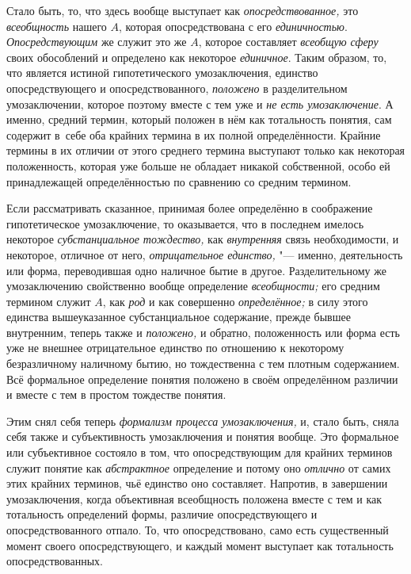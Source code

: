 Стало быть, то, что здесь вообще выступает как {\em опосредствованное,}
это {\em всеобщность} нашего $A$, которая опосредствована с его
{\em единичностью}. {\em Опосредствующим} же служит это же $A$,
которое составляет {\em всеобщую сферу}
своих обособлений и определено как некоторое {\em единичное}. Таким
образом, то, что является истиной гипотетического умозаключения, единство
опосредствующего и опосредствованного, {\em положено} в
разделительном умозаключении, которое поэтому вместе с тем уже и
{\em не есть умозаключение}.
А именно, средний термин, который положен в нём как
тотальность понятия, сам содержит в~себе оба крайних термина в их полной
определённости. Крайние термины в их отличии от этого среднего термина
выступают только как некоторая положенность, которая уже больше не обладает
никакой собственной, особо ей принадлежащей определённостью по сравнению со
средним термином.

Если рассматривать сказанное, принимая более определённо в
соображение гипотетическое умозаключение, то оказывается, что в последнем
имелось некоторое {\em субстанциальное тождество,} как {\em внутренняя} связь
необходимости, и некоторое, отличное от него,
{\em отрицательное единство,} "---
именно, деятельность или форма, переводившая одно наличное
бытие в другое. Разделительному же умозаключению свойственно вообще
определение {\em всеобщности;} его средним термином служит $A$,
как {\em род} и как совершенно {\em определённое;} в
силу этого единства вышеуказанное субстанциальное содержание, прежде бывшее
внутренним, теперь также и {\em положено,} и
обратно, положенность или форма есть уже не внешнее отрицательное единство
по отношению к некоторому безразличному наличному бытию, но тождественна с
тем плотным содержанием. Всё формальное определение понятия положено в
своём определённом различии и вместе с тем в простом тождестве понятия.

Этим снял себя теперь {\em формализм процесса умозаключения,}
и, стало быть, сняла себя также и субъективность
умозаключения и понятия вообще. Это формальное или субъективное состояло в
том, что опосредствующим для крайних терминов служит понятие как
{\em абстрактное} определение и потому оно {\em отлично} от самих
этих крайних терминов, чьё единство оно составляет. Напротив, в завершении
умозаключения, когда объективная всеобщность положена вместе с тем и как
тотальность определений формы, различие опосредствующего и
опосредствованного отпало. То, что опосредствовано, само есть существенный
момент своего опосредствующего, и каждый момент выступает как тотальность
опосредствованных.

